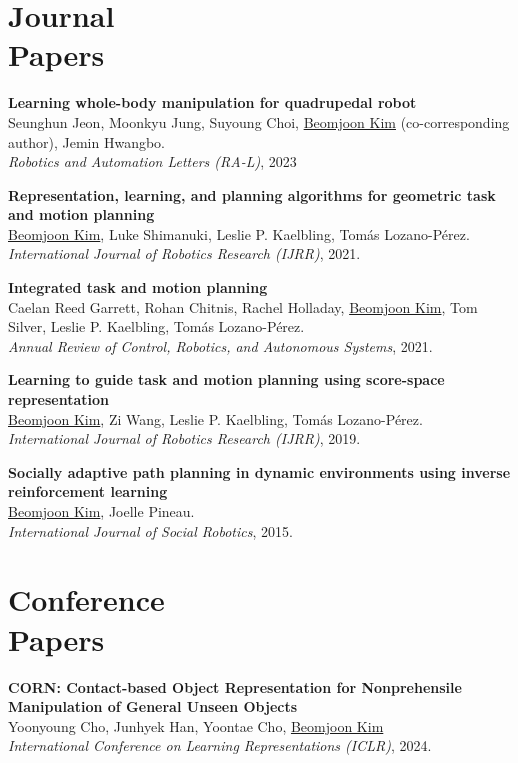 \documentclass[line,margin,letterpaper]{res}
\begin{document}
\begin{resume}
\section{Journal\\ Papers}
\textbf{Learning whole-body manipulation for quadrupedal robot}\\
Seunghun Jeon, Moonkyu Jung, Suyoung Choi, \underline{Beomjoon Kim} (co-corresponding author), Jemin Hwangbo. \\
{\sl Robotics and Automation Letters (RA-L)}, 2023

\textbf{Representation, learning, and planning algorithms for geometric task and motion planning}\\
\underline{Beomjoon Kim}, Luke Shimanuki, Leslie P. Kaelbling, Tom\'as Lozano-P\'erez.\\
{\sl International Journal of Robotics Research (IJRR)}, 2021.

\textbf{Integrated task and motion planning}\\
Caelan Reed Garrett, Rohan Chitnis, Rachel Holladay, \underline{Beomjoon Kim}, Tom Silver, Leslie P. Kaelbling, Tom\'as Lozano-P\'erez.\\
{\sl Annual Review of Control, Robotics, and Autonomous Systems}, 2021.

\textbf{Learning to guide task and motion planning using score-space representation}\\
\underline{Beomjoon Kim}, Zi Wang, Leslie P. Kaelbling, Tom\'as Lozano-P\'erez.\\
{\sl International Journal of Robotics Research (IJRR)}, 2019.

\textbf{Socially adaptive path planning in dynamic environments using inverse reinforcement learning}\\
\underline{Beomjoon Kim}, Joelle Pineau.\\
{\sl International Journal of Social Robotics}, 2015.

\section{Conference \\Papers}
\textbf{CORN: Contact-based Object Representation for Nonprehensile Manipulation of General Unseen Objects}\\
Yoonyoung Cho, Junhyek Han, Yoontae Cho, \underline{Beomjoon Kim} \\
{\sl International Conference on Learning Representations (ICLR)}, 2024.


\end{resume}
\end{document}
